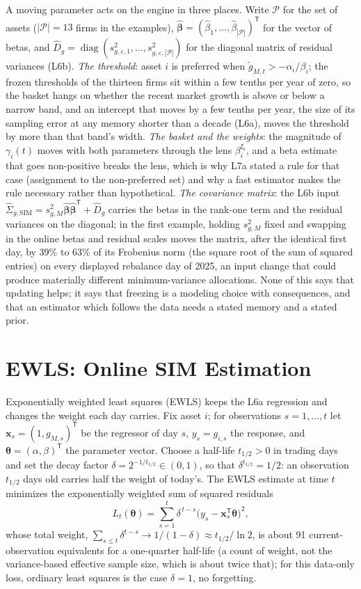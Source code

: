 \documentclass[11pt]{article}
\newcommand{\np}{|\mathcal P|}
\newcommand{\bx}{\mathbf x}
\newcommand{\bth}{\boldsymbol\theta}
\newcommand{\bbe}{\boldsymbol\beta}
\newcommand{\SigSIM}{\hat\Sigma_{g,\mathrm{SIM}}}
\newcommand{\gt}{\tilde g_{M,t}}
\newcommand{\thalf}{t_{1/2}}
\begin{document}
A moving parameter acts on the engine in three places. Write $\mathcal P$ for the set of assets ($\np=13$ firms in the examples), $\hat{\bbe}=(\hat\beta_1,\ldots,\hat\beta_{\np})^{\mathsf T}$ for the vector of betas, and $\hat D_g=\operatorname{diag}(s^2_{g,\varepsilon,1},\ldots,s^2_{g,\varepsilon,\np})$ for the diagonal matrix of residual variances (L6b). \emph{The threshold}: asset $i$ is preferred when $\gt>-\alpha_i/\beta_i$; the frozen thresholds of the thirteen firms sit within a few tenths per year of zero, so the basket hangs on whether the recent market growth is above or below a narrow band, and an intercept that moves by a few tenths per year, the size of its sampling error at any memory shorter than a decade (L6a), moves the threshold by more than that band's width. \emph{The basket and the weights}: the magnitude of $\gamma_i(t)$ moves with both parameters through the lens $\beta_i^{\xi_t}$, and a beta estimate that goes non-positive breaks the lens, which is why L7a stated a rule for that case (assignment to the non-preferred set) and why a fast estimator makes the rule necessary rather than hypothetical. \emph{The covariance matrix}: the L6b input $\SigSIM=s^2_{g,M}\hat{\bbe}\hat{\bbe}^{\mathsf T}+\hat D_g$ carries the betas in the rank-one term and the residual variances on the diagonal; in the first example, holding $s^2_{g,M}$ fixed and swapping in the online betas and residual scales moves the matrix, after the identical first day, by 39\% to 63\% of its Frobenius norm (the square root of the sum of squared entries) on every displayed rebalance day of 2025, an input change that could produce materially different minimum-variance allocations. None of this says that updating helps; it says that freezing is a modeling choice with consequences, and that an estimator which follows the data needs a stated memory and a stated prior.

\section{EWLS: Online SIM Estimation}

Exponentially weighted least squares (EWLS) keeps the L6a regression and changes the weight each day carries. Fix asset $i$; for observations $s=1,\ldots,t$ let $\bx_s=(1,g_{M,s})^{\mathsf T}$ be the regressor of day $s$, $y_s=g_{i,s}$ the response, and $\bth=(\alpha,\beta)^{\mathsf T}$ the parameter vector. Choose a half-life $\thalf>0$ in trading days and set the decay factor $\delta=2^{-1/\thalf}\in(0,1)$, so that $\delta^{\thalf}=1/2$: an observation $\thalf$ days old carries half the weight of today's. The EWLS estimate at time $t$ minimizes the exponentially weighted sum of squared residuals
\begin{equation}
  \label{eq:ewls-loss}
  L_t(\bth)=\sum_{s=1}^{t}\delta^{\,t-s}\bigl(y_s-\bx_s^{\mathsf T}\bth\bigr)^2 ,
\end{equation}
whose total weight, $\sum_{s\le t}\delta^{t-s}\to1/(1-\delta)\approx\thalf/\ln2$, is about 91 current-observation equivalents for a one-quarter half-life (a count of weight, not the variance-based effective sample size, which is about twice that); for this data-only loss, ordinary least squares is the case $\delta=1$, no forgetting.
\end{document}
